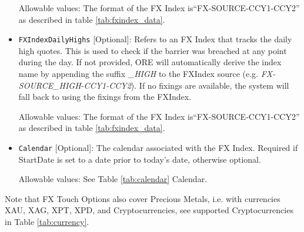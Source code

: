 \begin{itemize}
Allowable values:  The format of the FX Index is``FX-SOURCE-CCY1-CCY2'' as described in table \ref{tab:fxindex_data}.  

\item \lstinline!FXIndexDailyHighs! [Optional]: Refers to an FX Index that tracks the daily high quotes. This is used to check if the barrier was breached at any point during the day. If not provided, ORE will automatically derive the index name by appending the suffix \emph{\_HIGH} to the FXIndex source (e.g. \emph{FX-SOURCE\_HIGH-CCY1-CCY2}). If no fixings are available, the system will fall back to using the fixings from the FXIndex.

Allowable values:  The format of the FX Index is``FX-SOURCE-CCY1-CCY2'' as described in table \ref{tab:fxindex_data}. 

\item \lstinline!Calendar! [Optional]: The calendar associated with the FX Index. Required if StartDate is set to a date prior to today's date, otherwise optional.

Allowable values: See Table \ref{tab:calendar} Calendar.
\end{itemize}

Note that FX Touch Options also cover Precious Metals, i.e. with
currencies XAU, XAG, XPT, XPD, and Cryptocurrencies,  see supported Cryptocurrencies in Table \ref{tab:currency}.
